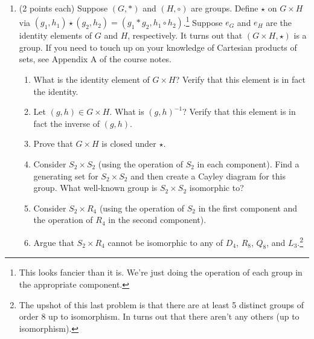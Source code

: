 \documentclass[11pt]{article}
\theoremstyle{definition}
\begin{document}
\begin{enumerate}
\newpage

\item (2 points each) Suppose $(G,*)$ and $(H,\circ)$ are groups.  Define $\star$ on $G\times H$ via $(g_1,h_1)\star(g_2,h_2)=(g_1*g_2,h_1\circ h_2)$.\footnote{This looks fancier than it is.  We're just doing the operation of each group in the appropriate component.}  Suppose $e_G$ and $e_H$ are the identity elements of $G$ and $H$, respectively.  It turns out that $(G\times H,\star)$ is a group.  If you need to touch up on your knowledge of Cartesian products of sets, see Appendix A of the course notes.

\begin{enumerate}
\item What is the identity element of $G\times H$?  Verify that this element is in fact the identity.

\item Let $(g,h)\in G\times H$.  What is $(g,h)^{-1}$?  Verify that this element is in fact the inverse of $(g,h)$.

\item Prove that $G\times H$ is closed under $\star$.

\item Consider $S_2\times S_2$ (using the operation of $S_2$ in each component).  Find a generating set for $S_2\times S_2$ and then create a Cayley diagram for this group.  What well-known group is $S_2\times S_2$ isomorphic to?

\item Consider $S_2\times R_4$ (using the operation of $S_2$ in the first component and the operation of $R_4$ in the second component). 

\item Argue that $S_2\times R_4$ cannot be isomorphic to any of $D_4$, $R_8$, $Q_8$, and $L_3$.\footnote{The upshot of this last problem is that there are at least 5 distinct groups of order 8 up to isomorphism.  In turns out that there aren't any others (up to isomorphism).}

\end{enumerate}

\end{enumerate}
\end{document}
